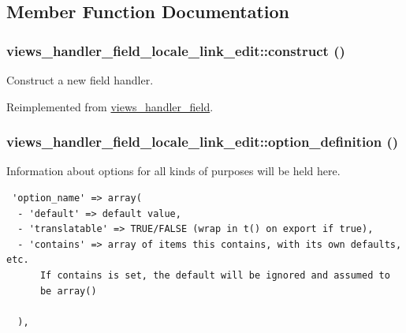 \subsection{Member Function Documentation}
\hypertarget{classviews__handler__field__locale__link__edit_6f7db94c0dc07564c1853fd7ef153a6e}{
\subsubsection[{construct}]{\setlength{\rightskip}{0pt plus 5cm}views\_\-handler\_\-field\_\-locale\_\-link\_\-edit::construct ()}}
\label{classviews__handler__field__locale__link__edit_6f7db94c0dc07564c1853fd7ef153a6e}


Construct a new field handler. 

Reimplemented from \hyperlink{classviews__handler__field_3d50050864c255b71c842972a45d39f6}{views\_\-handler\_\-field}.\hypertarget{classviews__handler__field__locale__link__edit_b96dd9ff121303f96d4f9cdbbb3ca906}{
\subsubsection[{option\_\-definition}]{\setlength{\rightskip}{0pt plus 5cm}views\_\-handler\_\-field\_\-locale\_\-link\_\-edit::option\_\-definition ()}}
\label{classviews__handler__field__locale__link__edit_b96dd9ff121303f96d4f9cdbbb3ca906}


Information about options for all kinds of purposes will be held here. 

\begin{Code}\begin{verbatim} 'option_name' => array(
  - 'default' => default value,
  - 'translatable' => TRUE/FALSE (wrap in t() on export if true),
  - 'contains' => array of items this contains, with its own defaults, etc.
      If contains is set, the default will be ignored and assumed to
      be array()

  ),
\end{verbatim}
\end{Code}

